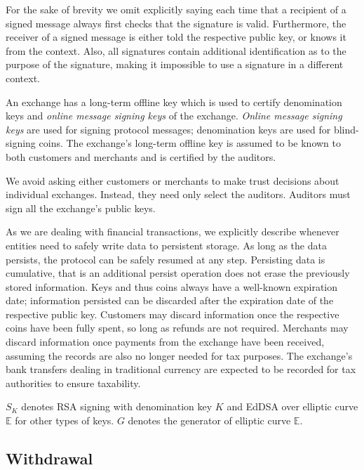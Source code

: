\documentclass[sigconf, authordraft]{acmart}
\begin{document}
\def\KDF{\textrm{KDF}}
\def\FDH{\textrm{FDH}}


For the sake of brevity we omit explicitly saying each time that a
recipient of a signed message always first checks that the signature
is valid.  Furthermore, the receiver of a signed message is either
told the respective public key, or knows it from the context.  Also,
all signatures contain additional identification as to the purpose of
the signature, making it impossible to use a signature in a different
context.

An exchange has a long-term offline key which is used to certify
denomination keys and {\em online message signing keys} of the
exchange.  {\em Online message signing keys} are used for signing
protocol messages; denomination keys are used for blind-signing coins.
The exchange's long-term offline key is assumed to be known to both
customers and merchants and is certified by the auditors.

We avoid asking either customers or merchants to make trust decisions
about individual exchanges.  Instead, they need only select the auditors.
Auditors must sign all the exchange's public keys.

As we are dealing with financial transactions, we explicitly describe
whenever entities need to safely write data to persistent storage.
As long as the data persists, the protocol can be safely
resumed at any step.  Persisting data is cumulative, that is an
additional persist operation does not erase the previously stored
information.  Keys and thus coins always have a well-known expiration
date; information persisted can be discarded after the
expiration date of the respective public key.
Customers may discard information once the respective coins have been
fully spent, so long as refunds are not required.
Merchants may discard information once payments from the exchange have
been received, assuming the records are also no longer needed for tax
purposes.  The exchange's bank transfers dealing in traditional currency
are expected to be recorded for tax authorities to ensure taxability.

$S_K$ denotes RSA signing with denomination key $K$ and EdDSA
over elliptic curve $\mathbb{E}$ for other types of keys.
$G$ denotes the generator of elliptic curve $\mathbb{E}$.

\subsection{Withdrawal}
\end{document}
